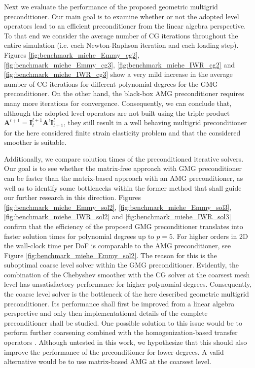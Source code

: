 \documentclass[times,doublespace]{nmeauth}
\def\gz  #1{           \mbox{$\boldsymbol{#1}$}}
\begin{document}
Next we evaluate the performance of the proposed geometric multigrid preconditioner.
{\color{red}
Our main goal is to examine whether or not the adopted level operators lead to an efficient preconditioner from the linear algebra perspective. To that end}
we consider {\color{red}the average number of CG iterations throughout the entire simulation (i.e. each Newton-Raphson iteration and each loading step).}
Figures \ref{fig:benchmark_miehe_Emmy_cg2}, \ref{fig:benchmark_miehe_Emmy_cg3}, \ref{fig:benchmark_miehe_IWR_cg2} and \ref{fig:benchmark_miehe_IWR_cg3} show a very mild increase in the average number of CG iterations for different polynomial degrees
{\color{red} for the GMG preconditioner.}
On the other hand, the black-box AMG preconditioner requires many more iterations for convergence.
{\color{red}
Consequently, we can conclude that, although the adopted level operators are not built using the triple product $\gz A^{l+1}=\gz I^{l+1}_{l} \gz A^l \gz I^l_{l+1}$, they still result in a well behaving multigrid preconditioner for the here considered finite strain elasticity problem and that the considered smoother is suitable.
}

{\color{red}
Additionally, we compare solution times of the preconditioned iterative solvers.
Our goal is to see whether the matrix-free approach with GMG preconditioner can be faster than the matrix-based approach with an AMG preconditioner,
as well as to identify some bottlenecks within the former method that shall guide our further research in this direction.}
Figures \ref{fig:benchmark_miehe_Emmy_sol2}, \ref{fig:benchmark_miehe_Emmy_sol3}, \ref{fig:benchmark_miehe_IWR_sol2} and \ref{fig:benchmark_miehe_IWR_sol3} confirm that the efficiency of the proposed GMG preconditioner translates into faster solution times for polynomial degrees up to $p=5$.
For higher orders in 2D the wall-clock time {\color{red}per DoF} is comparable to the AMG preconditioner, see Figure \ref{fig:benchmark_miehe_Emmy_sol2}.
The reason for this is the suboptimal coarse level solver within the GMG preconditioner.
Evidently, the combination of the Chebyshev smoother with the CG solver at the coarsest mesh level has unsatisfactory performance for higher polynomial degrees.
{\color{red}
Consequently, the coarse level solver is the bottleneck of the here described geometric multigrid preconditioner. Its performance shall first be improved from a linear algebra perspective and only then implementational details of the complete preconditioner shall be studied.}
One possible solution to this issue would be to perform further coarsening combined with the homogenization-based transfer operators \cite{Miehe2007}.
Although untested in this work, we hypothesize that this should also improve the performance of the preconditioner for lower degrees.
A valid alternative would be to use matrix-based AMG at the coarsest level.
\end{document}
